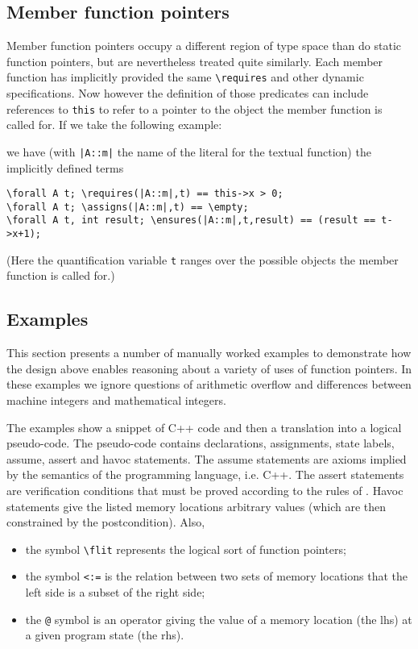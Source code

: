 \subsection{Member function pointers}
\label{sec:memberfp}
Member function pointers occupy a different region of type space than
do static function pointers, but are nevertheless treated quite
similarly. Each member function has implicitly provided the same
\lstinline|\requires| and other dynamic specifications. Now however
the definition of those predicates can include references to
\lstinline|this| to refer to a pointer to the object the member
function is called for. If we take the following example:



we have (with \lstinline+|A::m|+ the name of the literal for the textual
function) the implicitly defined terms

\begin{lstlisting}
\forall A t; \requires(|A::m|,t) == this->x > 0;
\forall A t; \assigns(|A::m|,t) == \empty;
\forall A t, int result; \ensures(|A::m|,t,result) == (result == t->x+1);
\end{lstlisting}
(Here the quantification variable \lstinline|t| ranges over the possible
objects the member function is called for.)

\subsection{Examples}
\label{sec:fpexamples}

This section presents a number of manually worked examples
to demonstrate how the design above enables reasoning about
a variety of uses of function pointers.
In these examples we ignore questions of arithmetic overflow and
differences between machine integers and mathematical integers.

The examples show a snippet of C++ code and then a translation into a logical
pseudo-code. The pseudo-code contains declarations, assignments, state labels, assume, assert and havoc statements.
The assume statements are axioms implied by the semantics of the
programming language, i.e. C++.
The assert statements are verification conditions that
must be proved according to the rules of \NAME.
Havoc statements give the listed memory locations arbitrary values (which are then constrained by the postcondition). Also,
\begin{itemize}[noitemsep,nolistsep]
	\item the symbol \lstinline|\flit| represents the logical sort of function pointers;
	\item the symbol \lstinline|<:=| is the relation between two sets of memory locations that the left side is a subset of the right side;
	\item the \lstinline|@| symbol is an operator giving the value of a memory location (the lhs) at a given program state (the rhs).
\end{itemize}

